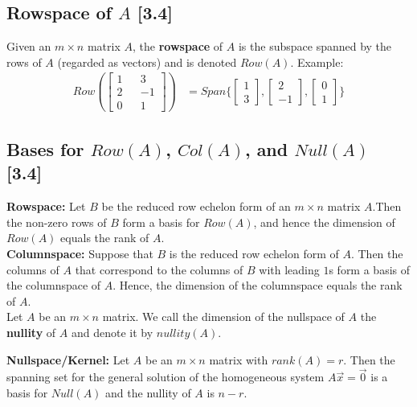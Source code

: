 \documentclass[a4paper,9pt]{extarticle}
\begin{document}
\begin{multicols*}{2}
\subsection{Rowspace of $A$ [3.4]}
Given an $m \times n$ matrix $A$, the \textbf{rowspace} of $A$ is the subspace spanned by the rows of $A$ (regarded as vectors) and is denoted $Row(A)$. Example:
\begin{equation} \label{3.4-4}
    \begin{split}
        Row(\begin{bmatrix}1 && 3 \\ 2 && -1 \\ 0 && 1\end{bmatrix}) & = Span\{ \begin{bmatrix}1 \\ 3\end{bmatrix}, \begin{bmatrix}2 \\ -1\end{bmatrix}, \begin{bmatrix}0 \\ 1\end{bmatrix}\}
    \end{split}
\end{equation}


\subsection{Bases for $Row(A)$, $Col(A)$, and $Null(A)$ [3.4]}
\textbf{Rowspace:} Let $B$ be the reduced row echelon form of an $m \times n$ matrix $A$.Then the non-zero rows of $B$ form a basis for $Row(A)$, and hence the dimension of $Row(A)$ equals the rank of $A$.\\

\textbf{Columnspace:} Suppose that $B$ is the reduced row echelon form of $A$. Then the columns of $A$ that correspond to the columns of $B$ with leading $1$s form a basis of the columnspace of $A$. Hence, the dimension of the columnspace equals the rank of $A$.\\

Let $A$ be an $m \times n$ matrix. We call the dimension of the nullspace of $A$ the \textbf{nullity} of $A$ and denote it by $nullity(A)$.

\textbf{Nullspace/Kernel:} Let $A$ be an $m \times n$ matrix with $rank(A) = r$. Then the spanning set for the general solution of the homogeneous system $A \vec{x} = \vec{0}$ is a basis for $Null(A)$ and the nullity of $A$ is $n - r$.


\end{multicols*}
\end{document}
